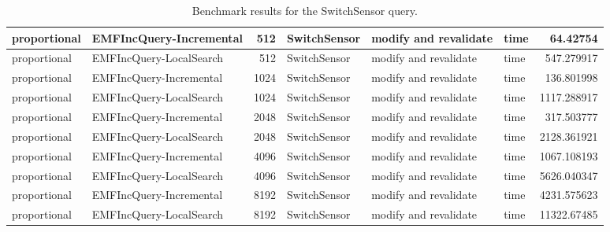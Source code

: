 \begin{table}
\begin{tabular}{| l | l | r | l | l | l | r |}
proportional & EMFIncQuery-Incremental & 512 & SwitchSensor & modify and revalidate & time & 64.42754\\\hline
proportional & EMFIncQuery-LocalSearch & 512 & SwitchSensor & modify and revalidate & time & 547.279917\\\hline
proportional & EMFIncQuery-Incremental & 1024 & SwitchSensor & modify and revalidate & time & 136.801998\\\hline
proportional & EMFIncQuery-LocalSearch & 1024 & SwitchSensor & modify and revalidate & time & 1117.288917\\\hline
proportional & EMFIncQuery-Incremental & 2048 & SwitchSensor & modify and revalidate & time & 317.503777\\\hline
proportional & EMFIncQuery-LocalSearch & 2048 & SwitchSensor & modify and revalidate & time & 2128.361921\\\hline
proportional & EMFIncQuery-Incremental & 4096 & SwitchSensor & modify and revalidate & time & 1067.108193\\\hline
proportional & EMFIncQuery-LocalSearch & 4096 & SwitchSensor & modify and revalidate & time & 5626.040347\\\hline
proportional & EMFIncQuery-Incremental & 8192 & SwitchSensor & modify and revalidate & time & 4231.575623\\\hline
proportional & EMFIncQuery-LocalSearch & 8192 & SwitchSensor & modify and revalidate & time & 11322.67485\\\hline

\end{tabular}\caption{Benchmark results for the \textsf{SwitchSensor} query.}
\label{tab:revalidation-switchsensor}
\end{table}
